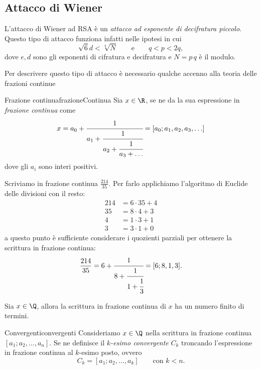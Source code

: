 \subsection{Attacco di Wiener}
	
	L'attacco di Wiener ad RSA è un \emph{attacco ad esponente di decifratura piccolo}.
	Questo tipo di attacco funziona infatti nelle ipotesi in cui
		\[
		\sqrt{6}d < \sqrt[4]{N} \qquad\text{e}\qquad q < p < 2q,
		\]
	dove \(e,d\) sono gli esponenti di cifratura e decifratura e \(N=p\,q\) è il modulo.

	Per descrivere questo tipo di attacco è necessario qualche accenno alla teoria delle frazioni continue

	\begin{defn}{Frazione continua}{frazioneContinua}
	Sia \(x\in \R\), se ne da la sua espressione in \emph{frazione continua} come
		\[
		x = a_0 + \cfrac{1}{a_1 + \cfrac{1}{a_2+\cfrac{1}{a_3+\ldots}}} = [a_0;a_1,a_2,a_3,\ldots]
		\]
	dove gli \(a_i\) sono interi positivi.
	\end{defn}

	\begin{ese}
	Scriviamo in frazione continua \(\frac{214}{35}\). Per farlo applichiamo l'algoritmo di Euclide delle divisioni con il resto:
		\begin{align*}
		214 & = 6\cdot 35 + 4\\
		35 & = 8\cdot 4 + 3\\
		4 & = 1\cdot 3 + 1\\
		3 & = 3\cdot 1 + 0
		\end{align*}
	a questo punto è sufficiente considerare i quozienti parziali per ottenere la scrittura in frazione continua:
		\[
		\frac{214}{35} = 6+\cfrac{1}{8+\cfrac{1}{1+\cfrac{1}{3}}} = [6;8,1,3].
		\]
	\end{ese}

	\begin{pr}
	Sia \(x\in\Q\), allora la scrittura in frazione continua di \(x\) ha un numero finito di termini.
	\end{pr}

	\begin{defn}{Convergenti}{convergenti}
	Consideriamo \(x\in\Q\) nella scrittura in frazione continua \([a_1;a_2,\ldots,a_n]\).
	Se ne definisce il \emph{\(k\)-esimo convergente} \(C_k\) troncando l'espressione in frazione continua al \(k\)-esimo posto, ovvero
		\[
		C_k = [a_1;a_2, \ldots, a_k] \qquad\text{con }k<n.
		\]
	\end{defn}

